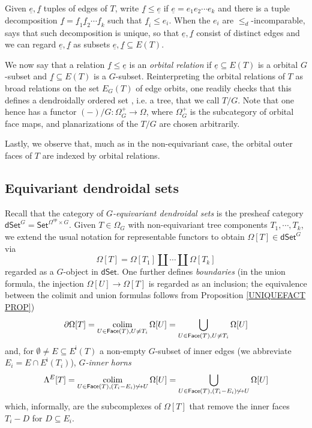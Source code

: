 \documentclass[a4paper,10pt
,draft
]{article}%
\begin{document}
\begin{remark}
Given $\underline{e},\underline{f}$ tuples of edges of $T$, 
write $\underline{f} \leq \underline{e}$
if $\underline{e} = e_1 e_2 \cdots e_k$
and there is a tuple decomposition
$\underline{f} = 
\underline{f}_1 \underline{f}_2 \cdots
\underline{f}_k$
such that $\underline{f}_i \leq e_i$.
When the $e_i$ are $\leq_d$-incomparable,
\cite[Prop. 5.30]{Per17} says that such decomposition is unique, so that $\underline{e},\underline{f}$ consist of distinct edges and we can regard 
$\underline{e},\underline{f}$ as subsets $\underline{e},\underline{f} \subseteq E(T)$.
	
We now say that a relation
$\underline{f} \leq \underline{e}$	
is an \textit{orbital relation} if
$\underline{e} \subseteq E(T)$
is a orbital $G$-subset and $\underline{f} \subseteq E(T)$ is a $G$-subset. 
Reinterpreting the orbital relations of $T$ 
as broad relations on the set $E_{G}(T)$ of edge orbits,
one readily checks that this defines a 
dendroidally ordered set \cite[Def. 5.9]{Per17},
i.e. a tree, that we call $T/G$.
Note that one hence has a functor
$(-)/G \colon \Omega_G^+ \to \Omega$,
where $\Omega_G^+$ is the subcategory of orbital face maps,
and planarizations of the $T/G$ are chosen arbitrarily.

Lastly, we observe that, much as in the non-equivariant case,
the orbital outer faces of $T$ are indexed by orbital relations.
\end{remark}




\subsection{Equivariant dendroidal sets}\label{EQDENDSETS SEC}

Recall \cite[\S 5.4]{Per17} that the category of 
\textit{$G$-equivariant dendroidal sets}
is the presheaf category 
$\mathsf{dSet}^G = \mathsf{Set}^{\Omega^{op} \times G}$.
Given $T \in \Omega_G$ with non-equivariant tree components $T_1,\cdots,T_k$,
we extend the usual notation for representable functors 
to obtain $\Omega[T] \in \mathsf{dSet}^G$ via
\[
	\Omega[T] = \Omega[T_1] \amalg \cdots \amalg \Omega[T_k]
\]
regarded as a $G$-object in $\mathsf{dSet}$.
One further defines \textit{boundaries} (in the union formula, 
the injection $\Omega[U] \to \Omega[T]$ is regarded as 
an inclusion; the equivalence between the colimit and union formulas follows from Proposition \ref{UNIQUEFACT PROP})
\[
	\partial \Omega[T] = 
	\mathop{\operatorname{colim}}_{U \in \mathsf{Face}(T),U \neq T_i}
	\Omega[U] =
	\bigcup_{U \in \mathsf{Face}(T),U \neq T_i}
	\Omega[U]
\]
and, for $\emptyset \neq E \subseteq E^{\mathsf{i}}(T)$ a
non-empty $G$-subset of inner edges 
(we abbreviate $E_i = E \cap E^{\mathsf{i}}(T_i)$), \textit{$G$-inner horns}
\[
	\Lambda^{E}[T] = 
	\mathop{\operatorname{colim}}_{U \in 
	\mathsf{Face}(T),
	(T_i - E_i) \not \hookrightarrow U}
	\Omega[U] =
	\bigcup_{U \in 
	\mathsf{Face}(T),
	(T_i - E_i) \not \hookrightarrow U}
	\Omega[U]
\]
which, informally, are the subcomplexes of $\Omega[T]$ that remove the inner faces $T_i-D$ for $D \subseteq E_i$.
\end{document}
